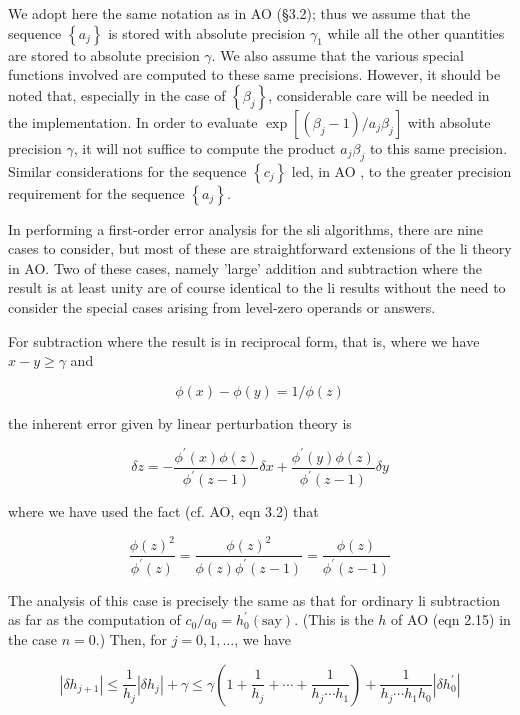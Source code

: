 \documentclass[10pt]{article}
\begin{document}
We adopt here the same notation as in AO (§3.2); thus we assume that the sequence $\left\{a_{j}\right\}$ is stored with absolute precision $\gamma_{1}$ while all the other quantities are stored to absolute precision $\gamma$. We also assume that the various special functions involved are computed to these same precisions. However, it should be noted that, especially in the case of $\left\{\beta_{j}\right\}$, considerable care will be needed in the implementation. In order to evaluate $\exp \left[\left(\beta_{j}-1\right) / a_{j} \beta_{j}\right]$ with absolute precision $\gamma$, it will not suffice to compute the product $a_{j} \beta_{j}$ to this same precision. Similar considerations for the sequence $\left\{c_{j}\right\}$ led, in AO , to the greater precision requirement for the sequence $\left\{a_{j}\right\}$.

In performing a first-order error analysis for the sli algorithms, there are nine cases to consider, but most of these are straightforward extensions of the li theory in AO. Two of these cases, namely 'large' addition and subtraction where the result is at least unity are of course identical to the li results without the need to consider the special cases arising from level-zero operands or answers.

For subtraction where the result is in reciprocal form, that is, where we have $x-y \geqslant \gamma$ and

$$
\phi(x)-\phi(y)=1 / \phi(z)
$$

the inherent error given by linear perturbation theory is

$$
\delta z=-\frac{\phi^{\prime}(x) \phi(z)}{\phi^{\prime}(z-1)} \delta x+\frac{\phi^{\prime}(y) \phi(z)}{\phi^{\prime}(z-1)} \delta y
$$

where we have used the fact (cf. AO, eqn 3.2) that

$$
\frac{\phi(z)^{2}}{\phi^{\prime}(z)}=\frac{\phi(z)^{2}}{\phi(z) \phi^{\prime}(z-1)}=\frac{\phi(z)}{\phi^{\prime}(z-1)}
$$

The analysis of this case is precisely the same as that for ordinary li subtraction as far as the computation of $c_{0} / a_{0}=h_{0}^{\prime}(\mathrm{say})$. (This is the $h$ of AO (eqn 2.15) in the case $n=0$.) Then, for $j=0,1, \ldots$, we have

$$
\left|\delta h_{j+1}\right| \leqslant \frac{1}{h_{j}}\left|\delta h_{j}\right|+\gamma \leqslant \gamma\left(1+\frac{1}{h_{j}}+\cdots+\frac{1}{h_{j} \cdots h_{1}}\right)+\frac{1}{h_{j} \cdots h_{1} h_{0}}\left|\delta h_{0}^{\prime}\right|
$$
\end{document}
